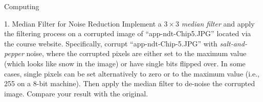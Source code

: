 \newpage
\begin{section}{Computing}
\begin{homeworkSection}{1. Median Filter for Noise Reduction}
Implement a $3 \times 3$ \textit{median filter} and apply the filtering  process on a corrupted image of “app-ndt-Chip5.JPG”
located via the course website. Specifically, corrupt “app-ndt-Chip-5.JPG” with \textit{salt-and-pepper} noise, where the corrupted pixels are either set to the maximum value (which looks like snow in the image) or have single bits flipped over. In some cases, single pixels can be set alternatively to zero or to the maximum value (i.e., 255 on a 8-bit machine). Then apply the median filter to de-noise the corrupted image. Compare your result with the original.
\\
\\
\end{homeworkSection}
\end{section}
